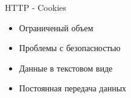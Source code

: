\begin{frame}{HTTP - Cookies}
 \begin{center}
 \begin{itemize}
 \item Ограниченый объем
 \item Проблемы с безопасностью
 \item Данные в текстовом виде
 \item Постоянная передача данных
 \end{itemize}
 \end{center}
\end{frame}
